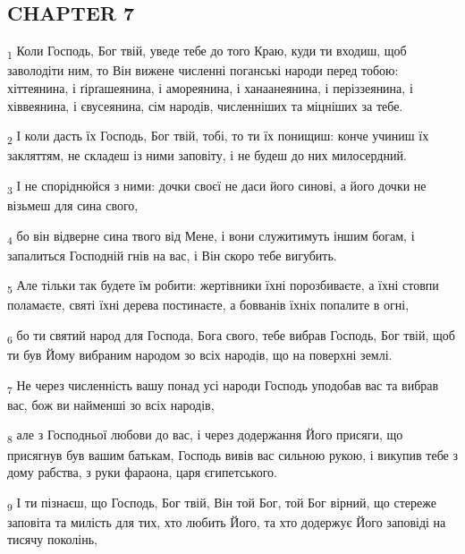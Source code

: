 \subsection{CHAPTER 7}
\begin{tcolorbox}
\textsubscript{1} Коли Господь, Бог твій, уведе тебе до того Краю, куди ти входиш, щоб заволодіти ним, то Він вижене численні поганські народи перед тобою: хіттеянина, і ґірґашеянина, і амореянина, і ханаанеянина, і періззеянина, і хіввеянина, і євусеянина, сім народів, численніших та міцніших за тебе.
\end{tcolorbox}
\begin{tcolorbox}
\textsubscript{2} І коли дасть їх Господь, Бог твій, тобі, то ти їх понищиш: конче учиниш їх закляттям, не складеш із ними заповіту, і не будеш до них милосердний.
\end{tcolorbox}
\begin{tcolorbox}
\textsubscript{3} І не споріднюйся з ними: дочки своєї не даси його синові, а його дочки не візьмеш для сина свого,
\end{tcolorbox}
\begin{tcolorbox}
\textsubscript{4} бо він відверне сина твого від Мене, і вони служитимуть іншим богам, і запалиться Господній гнів на вас, і Він скоро тебе вигубить.
\end{tcolorbox}
\begin{tcolorbox}
\textsubscript{5} Але тільки так будете їм робити: жертівники їхні порозбиваєте, а їхні стовпи поламаєте, святі їхні дерева постинаєте, а бовванів їхніх попалите в огні,
\end{tcolorbox}
\begin{tcolorbox}
\textsubscript{6} бо ти святий народ для Господа, Бога свого, тебе вибрав Господь, Бог твій, щоб ти був Йому вибраним народом зо всіх народів, що на поверхні землі.
\end{tcolorbox}
\begin{tcolorbox}
\textsubscript{7} Не через численність вашу понад усі народи Господь уподобав вас та вибрав вас, бож ви найменші зо всіх народів,
\end{tcolorbox}
\begin{tcolorbox}
\textsubscript{8} але з Господньої любови до вас, і через додержання Його присяги, що присягнув був вашим батькам, Господь вивів вас сильною рукою, і викупив тебе з дому рабства, з руки фараона, царя єгипетського.
\end{tcolorbox}
\begin{tcolorbox}
\textsubscript{9} І ти пізнаєш, що Господь, Бог твій, Він той Бог, той Бог вірний, що стереже заповіта та милість для тих, хто любить Його, та хто додержує Його заповіді на тисячу поколінь,
\end{tcolorbox}
